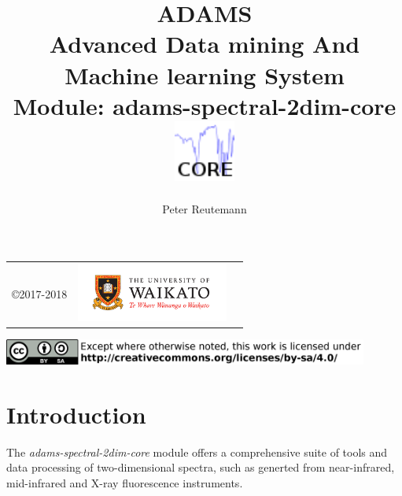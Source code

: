 \documentclass[a4paper]{book}
\title{
  \textbf{ADAMS} \\
  {\Large \textbf{A}dvanced \textbf{D}ata mining \textbf{A}nd \textbf{M}achine
  learning \textbf{S}ystem} \\
  {\Large Module: adams-spectral-2dim-core} \\
  \vspace{1cm}
  \includegraphics[width=2cm]{images/spectral-2dim-core-module.png} \\
}
\author{
  Peter Reutemann
}
\begin{document}
\begin{titlepage}
\maketitle

\thispagestyle{empty}
\center
\begin{table}[b]
	\begin{tabular}{c l l}
		\parbox[c][2cm]{2cm}{\copyright 2017-2018} &
		\parbox[c][2cm]{5cm}{\includegraphics[width=5cm]{images/coat_of_arms.pdf}} \\
	\end{tabular}
	\includegraphics[width=12cm]{images/cc.png} \\
\end{table}

\end{titlepage}

\tableofcontents
\listoffigures

\chapter{Introduction}
The \textit{adams-spectral-2dim-core} module offers a comprehensive suite
of tools and data processing of two-dimensional spectra, such as generted from
near-infrared\cite{nir}, mid-infrared\cite{mir} and X-ray fluorescence\cite{xrf}
instruments.

\end{document}
